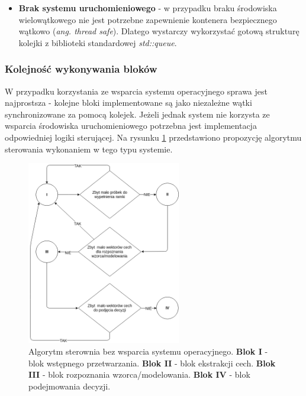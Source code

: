 \begin{itemize}
\item{\textbf{Brak systemu uruchomieniowego}} - w przypadku braku środowiska wielowątkowego nie jest potrzebne zapewnienie kontenera bezpiecznego wątkowo (\textit{ang. thread safe}). Dlatego wystarczy wykorzystać gotową strukturę kolejki z biblioteki standardowej \textit{std::queue}.
\end{itemize}

\subsubsection{Kolejność wykonywania bloków}

W przypadku korzystania ze wsparcia systemu operacyjnego sprawa jest najprostsza - kolejne bloki implementowane są jako niezależne wątki synchronizowane za pomocą kolejek. Jeżeli jednak system nie korzysta ze wsparcia środowiska uruchomieniowego potrzebna jest implementacja odpowiedniej logiki sterującej. Na rysunku {\ref{fig:logics}} przedstawiono propozycję algorytmu sterowania wykonaniem w tego typu systemie.

\begin{figure}[ht!]
  \centering
    \includegraphics[width=0.6\textwidth]{./logic.png}
    \caption{\label{fig:logics} Algorytm sterownia bez wsparcia systemu operacyjnego. \textbf{Blok I} - blok wstępnego przetwarzania. \textbf{Blok II} - blok ekstrakcji cech. \textbf{Blok III} - blok rozpoznania wzorca/modelowania. \textbf{Blok IV} - blok podejmowania decyzji.}
\end{figure}


